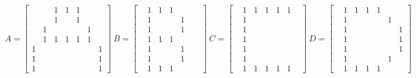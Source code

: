 \documentclass{article}
\begin{document}
	\[
	A = 
	\begin{bmatrix}
	&&1&1&1&&\\
	&&1&&1&&\\
	&1&&&&1&\\
	&1&1&1&1&1&\\
	1&&&&&&1\\
	1&&&&&&1\\
	1&&&&&&1
	\end{bmatrix}
	~B = 
	\begin{bmatrix}
	&1&1&1&&&\\
	&1&&&1&&\\
	&1&&&1&&\\
	&1&1&1&&&\\
	&1&&&1&&\\
	&1&&&1&&\\
	&1&1&1&&&
	\end{bmatrix}
	~C = 
	\begin{bmatrix}
	&1&1&1&1&1&\\
	&1&&&&&\\
	&1&&&&&\\
	&1&&&&&\\
	&1&&&&&\\
	&1&&&&&\\
	&1&1&1&1&1&
	\end{bmatrix}
	~D = 
	\begin{bmatrix}
	&1&1&1&1&&\\
	&1&&&&1&\\
	&1&&&&&1\\
	&1&&&&&1\\
	&1&&&&&1\\
	&1&&&&1&\\
	&1&1&1&1&&
	\end{bmatrix}
	\]
\end{document}
